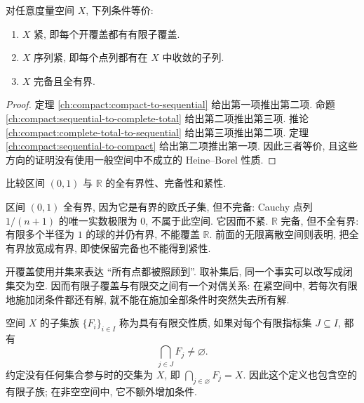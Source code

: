 \begin{theorem}[度量紧性的三个等价条件]
\label{ch:compact:equivalence}
对任意度量空间 $X$, 下列条件等价:
\begin{enumerate}
 \item $X$ 紧, 即每个开覆盖都有有限子覆盖.
 \item $X$ 序列紧, 即每个点列都有在 $X$ 中收敛的子列.
 \item $X$ 完备且全有界.
\end{enumerate}
\end{theorem}
\begin{proof}
定理 \ref{ch:compact:compact-to-sequential} 给出第一项推出第二项. 命题 \ref{ch:compact:sequential-to-complete-total} 给出第二项推出第三项. 推论 \ref{ch:compact:complete-total-to-sequential} 给出第三项推出第二项. 定理 \ref{ch:compact:sequential-to-compact} 给出第二项推出第一项. 因此三者等价, 且这些方向的证明没有使用一般空间中不成立的 Heine--Borel 性质.
\end{proof}

\begin{example}
比较区间 $(0,1)$ 与 $\mathbb{R}$ 的全有界性、完备性和紧性.
\end{example}
\begin{solution}
区间 $(0,1)$ 全有界, 因为它是有界的欧氏子集, 但不完备: Cauchy 点列 $1/(n+1)$ 的唯一实数极限为 $0$, 不属于此空间. 它因而不紧. $\mathbb{R}$ 完备, 但不全有界: 有限多个半径为 $1$ 的球的并仍有界, 不能覆盖 $\mathbb{R}$. 前面的无限离散空间则表明, 把全有界放宽成有界, 即使保留完备也不能得到紧性.
\end{solution}

\label{ch:compact:finite-intersections}

开覆盖使用并集来表达 ``所有点都被照顾到''. 取补集后, 同一个事实可以改写成闭集交为空. 因而有限子覆盖与有限交之间有一个对偶关系: 在紧空间中, 若每次有限地施加闭条件都还有解, 就不能在施加全部条件时突然失去所有解.

\begin{definition}[有限交性质]
空间 $X$ 的子集族 $\{F_i\}_{i\in I}$ 称为具有有限交性质, 如果对每个有限指标集 $J\subseteq I$, 都有
\[
 \bigcap_{j\in J}F_j\ne\varnothing.
\]
约定没有任何集合参与时的交集为 $X$, 即 $\bigcap_{j\in\varnothing}F_j=X$. 因此这个定义也包含空的有限子族; 在非空空间中, 它不额外增加条件.
\end{definition}

